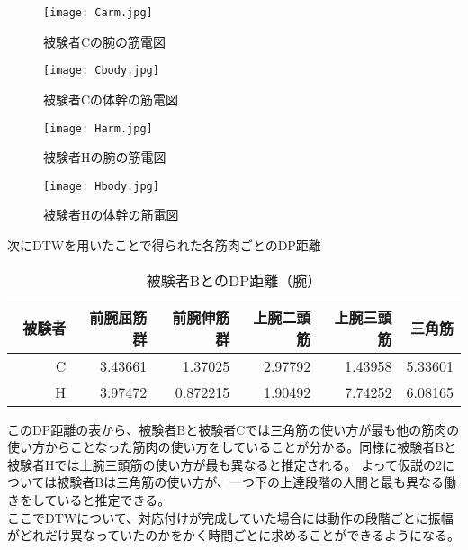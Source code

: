 \documentclass[11pt,a4j,notitlepage]{jreport}
\begin{document}
\begin{figure}[htbp]

\begin{center}

\texttt{[image: Carm.jpg]}
\caption{被験者Cの腕の筋電図}
\end{center}

\begin{center}
\texttt{[image: Cbody.jpg]}
\caption{被験者Cの体幹の筋電図}

\end{center}

\end{figure}\begin{figure}[htbp]

\begin{center}

\texttt{[image: Harm.jpg]}
\caption{被験者Hの腕の筋電図}
\end{center}

\begin{center}
\texttt{[image: Hbody.jpg]}
\caption{被験者Hの体幹の筋電図}

\end{center}

\end{figure}
次にDTWを用いたことで得られた各筋肉ごとのDP距離
\begin{table}[htb]
\label{tab:meta}
\begin{tabular}{|r||r|r|r|r|r|}\hline
被験者　&前腕屈筋群&前腕伸筋群&上腕二頭筋&上腕三頭筋&三角筋\\ \hline\hline
C&3.43661&1.37025&2.97792&1.43958&5.33601\\ \hline
H&3.97472&0.872215&1.90492&7.74252&6.08165\\ \hline
\end{tabular}
\caption{被験者BとのDP距離（腕）}
\end{table}
このDP距離の表から、被験者Bと被験者Cでは三角筋の使い方が最も他の筋肉の使い方からことなった筋肉の使い方をしていることが分かる。同様に被験者Bと被験者Hでは上腕三頭筋の使い方が最も異なると推定される。
よって仮説の2については被験者Bは三角筋の使い方が、一つ下の上達段階の人間と最も異なる働きをしていると推定できる。\\
ここでDTWについて、対応付けが完成していた場合には動作の段階ごとに振幅がどれだけ異なっていたのかをかく時間ごとに求めることができるようになる。
\end{document}
